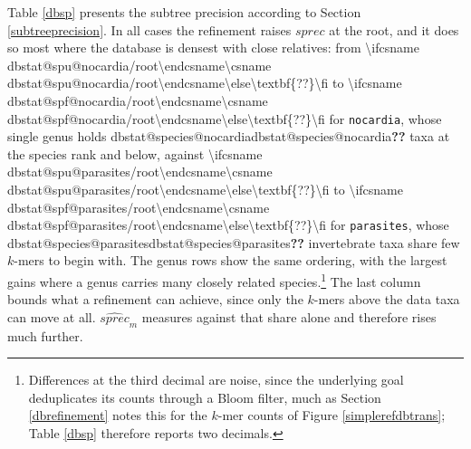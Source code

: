\documentclass[pdflatex,sn-vancouver-num]{sn-jnl}
\makeatletter
\providecommand{\sysUnknown}{\textbf{??}}
\newcommand{\dbstat}[2]{\ifcsname dbstat@#1@#2\endcsname\csname dbstat@#1@#2\endcsname\else\sysUnknown\fi}
\newcommand{\sprecpair}[2][4]{%
\num[round-mode=places,round-precision=#1,group-digits=none]{\dbstat{spu}{#2}} to \num[round-mode=places,round-precision=#1,group-digits=none]{\dbstat{spf}{#2}}}
\makeatother
\begin{document}
    Table \ref{dbsp} presents the subtree precision according to Section \ref{subtreeprecision}. In all cases the refinement raises $\mathit{sprec}$ at the root, and it does so most where the database is densest with close relatives: from \sprecpair[2]{nocardia/root} for \texttt{nocardia}, whose single genus holds \dbstat{species}{nocardia} taxa at the species rank and below, against \sprecpair[2]{parasites/root} for \texttt{parasites}, whose \dbstat{species}{parasites} invertebrate taxa share few $k$-mers to begin with. The genus rows show the same ordering, with the largest gains where a genus carries many closely related species.\footnote{Differences at the third decimal are noise, since the underlying goal deduplicates its counts through a Bloom filter, much as Section \ref{dbrefinement} notes this for the $k$-mer counts of Figure \ref{simplerefdbtrans}; Table \ref{dbsp} therefore reports two decimals.} The last column bounds what a refinement can achieve, since only the $k$-mers above the data taxa can move at all. $\widehat{\mathit{sprec}}_m$ measures against that share alone and therefore rises much further.
\end{document}
